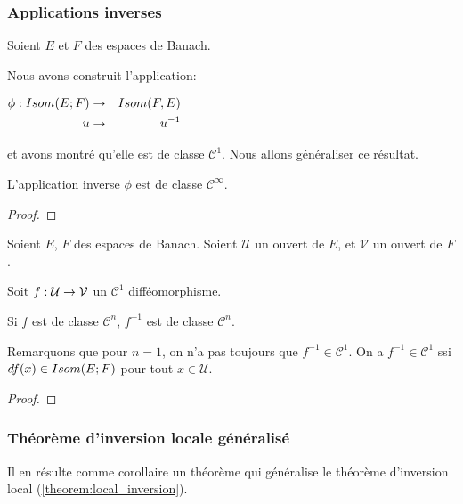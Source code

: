 \subsubsection{Applications inverses}

Soient $E$ et $F$ des espaces de Banach.

Nous avons construit l'application:

\begin{center}
$
\begin{aligned}
	\phi : 	Isom(E; F) &\rightarrow& Isom(F, E) \\
			u &\rightarrow& u^{-1}
\end{aligned}
$
\end{center}
et avons montré qu'elle est de classe $\mathcal{C}^{1}$. Nous allons généraliser
ce résultat.

\begin{proposition}
	L'application inverse $\phi$ est de classe $\mathcal{C}^{\infty}$.
\end{proposition}

\ifdefined\outputproof
\begin{proof}

\end{proof}
\fi

\begin{proposition}
	Soient $E$, $F$ des espaces de Banach.
	Soient $\mathcal{U}$ un ouvert de $E$, et $\mathcal{V}$ un ouvert de $F$.

	Soit $f : \mathcal{U} \rightarrow \mathcal{V}$ un $\mathcal{C}^{1}$
	difféomorphisme.

	Si $f$ est de classe $\mathcal{C}^{n}$, $f^{-1}$ est de classe
	$\mathcal{C}^{n}$.
\end{proposition}

Remarquons que pour $n = 1$, on n'a pas toujours que $f^{-1} \in
\mathcal{C}^{1}$. On a $f^{-1} \in \mathcal{C}^{1}$ ssi $df(x) \in Isom(E; F)$
pour tout $x \in \mathcal{U}$.

\ifdefined\outputproof
\begin{proof}

\end{proof}
\fi

\subsubsection{Théorème d'inversion locale généralisé}

Il en résulte comme corollaire un théorème qui généralise le théorème
d'inversion local (\ref{theorem:local_inversion}).

